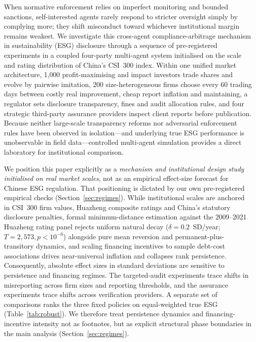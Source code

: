 \documentclass[11pt]{article}
\begin{document}
When normative enforcement relies on imperfect monitoring and bounded sanctions, self-interested agents rarely respond to stricter oversight simply by complying more; they shift misconduct toward whichever institutional margin remains weakest. We investigate this cross-agent compliance-arbitrage mechanism in sustainability (ESG) disclosure through a sequence of pre-registered experiments in a coupled four-party multi-agent system initialised on the scale and rating distribution of China's CSI~300 index. Within one unified market architecture, 1,000 profit-maximising and impact investors trade shares and evolve by pairwise imitation, 200 size-heterogeneous firms choose every 60 trading days between costly real improvement, cheap report inflation and maintaining, a regulator sets disclosure transparency, fines and audit allocation rules, and four strategic third-party assurance providers inspect client reports before publication. Because neither large-scale transparency reforms nor adversarial enforcement rules have been observed in isolation---and underlying true ESG performance is unobservable in field data---controlled multi-agent simulation provides a direct laboratory for institutional comparison.

We position this paper explicitly as a \emph{mechanism and institutional design study initialised on real market scales}, not as an empirical effect-size forecast for Chinese ESG regulation. That positioning is dictated by our own pre-registered empirical checks (Section~\ref{sec:regimes}). While institutional scales are anchored in CSI~300 firm values, Huazheng composite ratings and China's statutory disclosure penalties, formal minimum-distance estimation against the 2009--2021 Huazheng rating panel rejects uniform natural decay ($\delta = 0.2$~SD/year; $T = 2{,}573, p < 10^{-6}$) alongside pure mean reversion and permanent-plus-transitory dynamics, and scaling financing incentives to sample debt-cost associations drives near-universal inflation and collapses rank persistence. Consequently, absolute effect sizes in standard deviations are sensitive to persistence and financing regimes. The targeted-audit experiments trace shifts in misreporting across firm sizes and reporting thresholds, and the assurance experiments trace shifts across verification providers. A separate set of comparisons ranks the three fixed policies on equal-weighted true ESG (Table~\ref{tab:robust}). We therefore treat persistence dynamics and financing-incentive intensity not as footnotes, but as explicit structural phase boundaries in the main analysis (Section~\ref{sec:regimes}).
\end{document}
